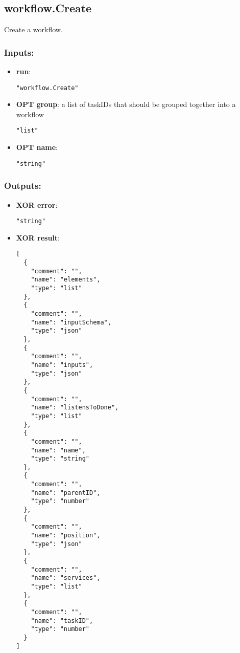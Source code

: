 \subsection{workflow.Create}
Create a workflow.
\subsubsection*{Inputs:}
\begin{itemize}
    \item \textbf{run}: 
\begin{lstlisting}
"workflow.Create"
\end{lstlisting}
    \item \textbf{OPT group}: a list of taskIDs that should be grouped together into a workflow
\begin{lstlisting}
"list"
\end{lstlisting}
    \item \textbf{OPT name}: 
\begin{lstlisting}
"string"
\end{lstlisting}
  \end{itemize}

\subsubsection*{Outputs:}
\begin{itemize}
    \item \textbf{XOR error}: 
\begin{lstlisting}
"string"
\end{lstlisting}
    \item \textbf{XOR result}: 
\begin{lstlisting}
[
  {
    "comment": "", 
    "name": "elements", 
    "type": "list"
  }, 
  {
    "comment": "", 
    "name": "inputSchema", 
    "type": "json"
  }, 
  {
    "comment": "", 
    "name": "inputs", 
    "type": "json"
  }, 
  {
    "comment": "", 
    "name": "listensToDone", 
    "type": "list"
  }, 
  {
    "comment": "", 
    "name": "name", 
    "type": "string"
  }, 
  {
    "comment": "", 
    "name": "parentID", 
    "type": "number"
  }, 
  {
    "comment": "", 
    "name": "position", 
    "type": "json"
  }, 
  {
    "comment": "", 
    "name": "services", 
    "type": "list"
  }, 
  {
    "comment": "", 
    "name": "taskID", 
    "type": "number"
  }
]
\end{lstlisting}
  \end{itemize}

